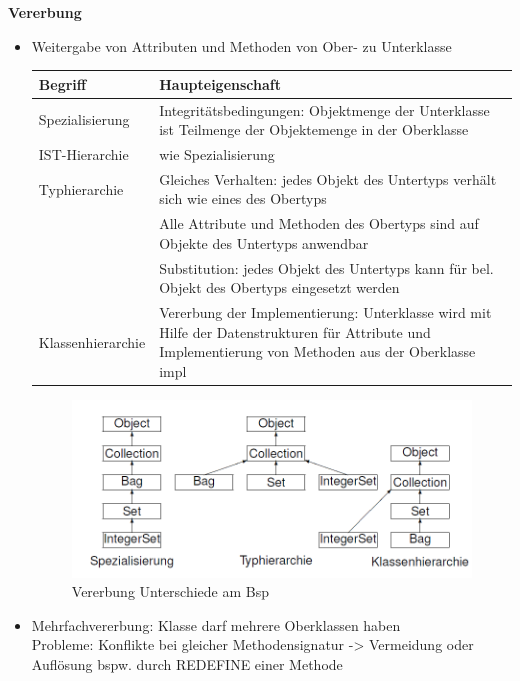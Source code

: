 \textbf{Vererbung}
\begin{itemize}
	\item Weitergabe von Attributen und Methoden von Ober- zu Unterklasse
	\begin{table}[!h]
		\begin{tabular}{|l|p{30em}|}
			\hline
			Begriff	& Haupteigenschaft\\
			\hline
			\hline
			Spezialisierung	& Integritätsbedingungen: Objektmenge der Unterklasse ist Teilmenge der Objektemenge in der Oberklasse\\
			\hline
			IST-Hierarchie	& wie Spezialisierung\\
			\hline
			Typhierarchie	& Gleiches Verhalten: jedes Objekt des Untertyps verhält sich wie eines des Obertyps\\
							& Alle Attribute und Methoden des Obertyps sind auf Objekte des Untertyps anwendbar\\
							& Substitution: jedes Objekt des Untertyps kann für bel. Objekt des Obertyps eingesetzt werden\\
			\hline
			Klassenhierarchie	& Vererbung der Implementierung: Unterklasse wird mit Hilfe der Datenstrukturen für Attribute und Implementierung von Methoden aus der Oberklasse impl\\
			\hline
		\end{tabular}
	\end{table}
	
	\begin{figure}[!h]
		\centering
		\includegraphics[scale=0.6]{img/oopl_inheritance.png}
		\caption{Vererbung Unterschiede am Bsp}
	\end{figure}
	
	\item Mehrfachvererbung: Klasse darf mehrere Oberklassen haben\\
	Probleme: Konflikte bei gleicher Methodensignatur -> Vermeidung oder Auflösung bspw. durch REDEFINE einer Methode
\end{itemize}

